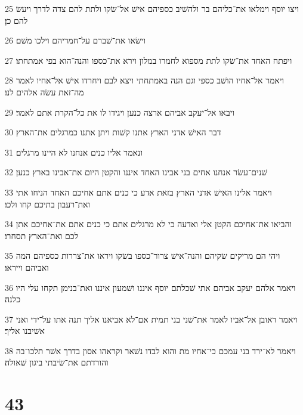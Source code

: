 \par 25 ויצו יוסף וימלאו את־כליהם בר ולהשׁיב כספיהם אישׁ אל־שׂקו ולתת להם צדה לדרך ויעשׂ להם כן׃
\par 26 וישׂאו את־שׁברם על־חמריהם וילכו משׁם׃
\par 27 ויפתח האחד את־שׂקו לתת מספוא לחמרו במלון וירא את־כספו והנה־הוא בפי אמתחתו׃
\par 28 ויאמר אל־אחיו הושׁב כספי וגם הנה באמתחתי ויצא לבם ויחרדו אישׁ אל־אחיו לאמר מה־זאת עשׂה אלהים לנו׃
\par 29 ויבאו אל־יעקב אביהם ארצה כנען ויגידו לו את כל־הקרת אתם לאמר׃
\par 30 דבר האישׁ אדני הארץ אתנו קשׁות ויתן אתנו כמרגלים את־הארץ׃
\par 31 ונאמר אליו כנים אנחנו לא היינו מרגלים׃
\par 32 שׁנים־עשׂר אנחנו אחים בני אבינו האחד איננו והקטן היום את־אבינו בארץ כנען׃
\par 33 ויאמר אלינו האישׁ אדני הארץ בזאת אדע כי כנים אתם אחיכם האחד הניחו אתי ואת־רעבון בתיכם קחו ולכו׃
\par 34 והביאו את־אחיכם הקטן אלי ואדעה כי לא מרגלים אתם כי כנים אתם את־אחיכם אתן לכם ואת־הארץ תסחרו׃
\par 35 ויהי הם מריקים שׂקיהם והנה־אישׁ צרור־כספו בשׂקו ויראו את־צררות כספיהם המה ואביהם וייראו׃
\par 36 ויאמר אלהם יעקב אביהם אתי שׁכלתם יוסף איננו ושׁמעון איננו ואת־בנימן תקחו עלי היו כלנה׃
\par 37 ויאמר ראובן אל־אביו לאמר את־שׁני בני תמית אם־לא אביאנו אליך תנה אתו על־ידי ואני אשׁיבנו אליך׃
\par 38 ויאמר לא־ירד בני עמכם כי־אחיו מת והוא לבדו נשׁאר וקראהו אסון בדרך אשׁר תלכו־בה והורדתם את־שׂיבתי ביגון שׁאולה׃

\chapter{43}


